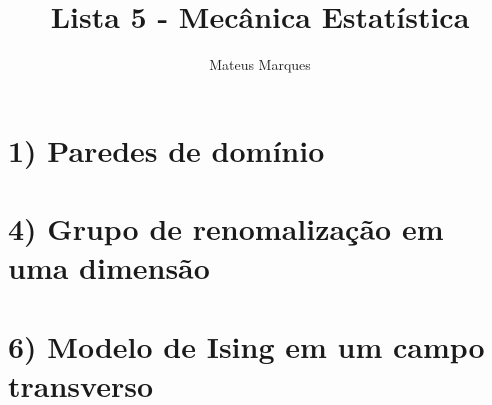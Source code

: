 \documentclass[a4paper,10pt]{article}
\title{\Huge{\textbf{Lista 5 - Mecânica Estatística}}}
\author{Mateus Marques}
\begin{document}
\maketitle

\section*{1) Paredes de domínio}


\pagebreak

\section*{4) Grupo de renomalização em uma dimensão}



\pagebreak

\section*{6) Modelo de Ising em um campo transverso}



%
%
\end{document}
